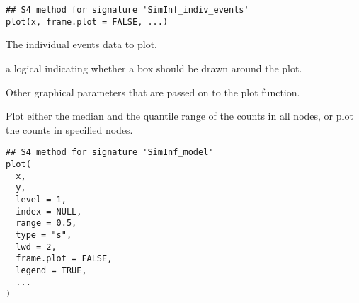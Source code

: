 \documentclass[letterpaper]{book}
\begin{document}
%
\begin{Usage}
\begin{verbatim}
## S4 method for signature 'SimInf_indiv_events'
plot(x, frame.plot = FALSE, ...)
\end{verbatim}
\end{Usage}
%
\begin{Arguments}
\begin{ldescription}
\item[\code{x}] The individual events data to plot.

\item[\code{frame.plot}] a logical indicating whether a box should be
drawn around the plot.

\item[\code{...}] Other graphical parameters that are passed on to the
plot function.
\end{ldescription}
\end{Arguments}
%
\begin{Description}
Plot either the median and the quantile range of the counts in all
nodes, or plot the counts in specified nodes.
\end{Description}
%
\begin{Usage}
\begin{verbatim}
## S4 method for signature 'SimInf_model'
plot(
  x,
  y,
  level = 1,
  index = NULL,
  range = 0.5,
  type = "s",
  lwd = 2,
  frame.plot = FALSE,
  legend = TRUE,
  ...
)
\end{verbatim}
\end{Usage}
%
\end{document}
